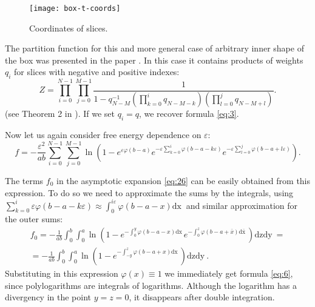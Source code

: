 \documentclass{article}
\newcommand{\dx}{\mathrm{dx}~}
\newcommand{\dxb}{\mathrm{d\bar x}~}
\newcommand{\dy}{\mathrm{dy}~}
\newcommand{\dz}{\mathrm{dz}}
\begin{document}
\begin{figure}[htbp]
  \texttt{[image: box-t-coords]}
  \caption{\label{fig:box-t-coords} Coordinates of slices.}
\end{figure}

The partition function for this and more general case of arbitrary inner shape of the box was
presented in the paper \cite{okounkov2007random}. In this case it contains products of weights
$q_{i}$ for slices with negative and positive indexes:
\begin{equation}
  \label{eq:13}
  Z=\prod_{i=0}^{N-1}\prod_{j=0}^{M-1} \frac{1}{1-q_{N-M}^{-1}\left(\prod_{k=0}^{i}q_{N-M-k}\right)\left(\prod_{l=0}^{j}q_{N-M+l}\right)}.
\end{equation}
(see Theorem 2 in \cite{okounkov2007random}).
If we set $q_{i}=q$, we recover formula \eqref{eq:3}.

Now let us again consider free energy dependence on $\varepsilon$:
\begin{equation}
  \label{eq:21}
  f=-\frac{\varepsilon^{2}}{ab}\sum_{i=0}^{N-1}\sum_{j=0}^{M-1}\ln
  \left(1-e^{\varepsilon \varphi(b-a)}e^{-\varepsilon\sum_{k=0}^{i}\varphi\left(b-a-k\varepsilon\right)}
    e^{-\varepsilon\sum_{l=0}^{j}\varphi\left(b-a+l\varepsilon\right)} \right).
\end{equation}

The terms $f_{0}$  in the asymptotic expansion \eqref{eq:26} can be easily obtained from
this expression. To do so we need to approximate the sums by the integrals, using
$\sum_{k=0}^{i}\varepsilon\varphi(b-a-k\varepsilon)\approx
\int_{0}^{i\varepsilon}\varphi(b-a-x)\dx$%
and similar approximation for the outer sums:
\begin{multline}
  \label{eq:74}
  f_{0}=-\frac{1}{ab}\int_{0}^{b}\int_{0}^{a}\ln
  \left(1-e^{-\int_{0}^{y}\varphi\left(b-a-x\right)\dx}
    e^{-\int_{0}^{z}\varphi\left(b-a+\bar x\right)\dxb} \right)\dz\dy=\\
  =-\frac{1}{ab}\int_{0}^{b}\int_{0}^{a}\ln
  \left(1-e^{-\int_{-y}^{z}\varphi\left(b-a+x\right)\dx} \right)\dz\dy.
\end{multline}
Substituting in this expression $\varphi(x)\equiv 1$ we immediately get formula \eqref{eq:6}, since
polylogarithms are integrals of logarithms. Although the logarithm has a divergency in the point
$y=z=0$, it disappears after double integration.
\end{document}
